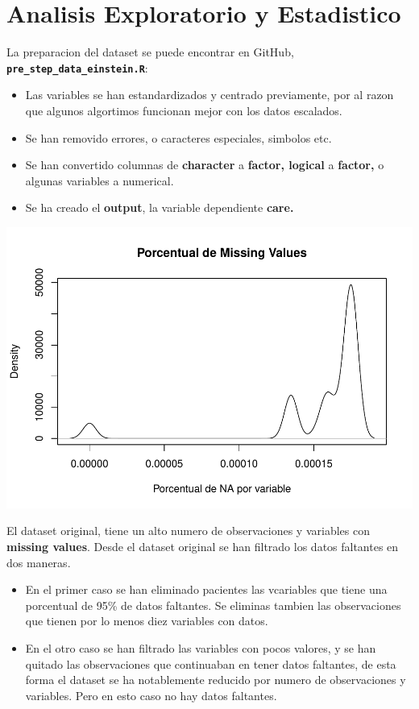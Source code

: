 \documentclass[
]{article}
\author{}
\date{\vspace{-2.5em}}
\begin{document}
\hypertarget{analisis-exploratorio-y-estadistico}{%
\section{Analisis Exploratorio y
Estadistico}\label{analisis-exploratorio-y-estadistico}}

La preparacion del dataset se puede encontrar en GitHub,
\textbf{\texttt{pre\_step\_data\_einstein.R}}:

\begin{itemize}
\item
  Las variables se han estandardizados y centrado previamente, por al
  razon que algunos algortimos funcionan mejor con los datos escalados.
\item
  Se han removido errores, o caracteres especiales, simbolos etc.
\item
  Se han convertido columnas de \textbf{character} a \textbf{factor,
  logical} a \textbf{factor,} o algunas variables a numerical.
\item
  Se ha creado el \textbf{output}, la variable dependiente
  \textbf{care.}
\end{itemize}

\includegraphics{04_Stat_An_files/figure-latex/unnamed-chunk-2-1.pdf}

El dataset original, tiene un alto numero de observaciones y variables
con \textbf{missing values}. Desde el dataset original se han filtrado
los datos faltantes en dos maneras.

\begin{itemize}
\item
  En el primer caso se han eliminado pacientes las vcariables que tiene
  una porcentual de 95\% de datos faltantes. Se eliminas tambien las
  observaciones que tienen por lo menos diez variables con datos.
\item
  En el otro caso se han filtrado las variables con pocos valores, y se
  han quitado las observaciones que continuaban en tener datos
  faltantes, de esta forma el dataset se ha notablemente reducido por
  numero de observaciones y variables. Pero en esto caso no hay datos
  faltantes.
\end{itemize}
\end{document}
